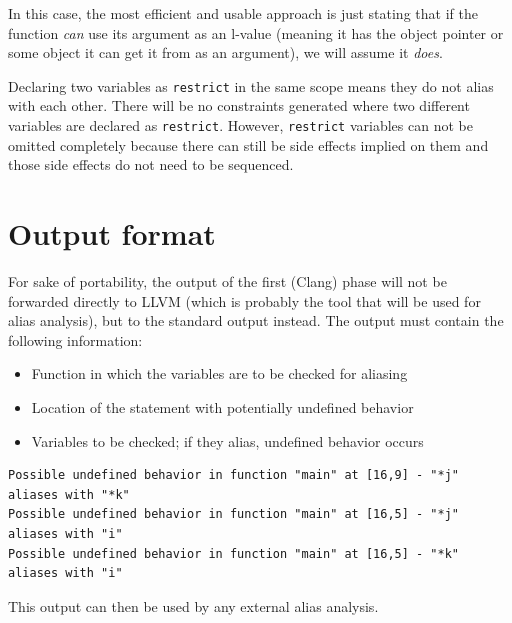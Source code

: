 In this case, the most efficient and usable approach is just stating that if the function \emph{can} use its argument as an l-value (meaning it has the object pointer or some object it can get it from as an argument), we will assume it \emph{does}.

Declaring two variables as \verb|restrict| in the same scope means they do not alias with each other.
There will be no constraints generated where two different variables are declared as \verb|restrict|.
However, \verb|restrict| variables can not be omitted completely because there can still be side effects
implied on them and those side effects do not need to be sequenced.

\section{Output format}
For sake of portability, the output of the first (Clang) phase will not be forwarded directly to LLVM (which is probably the tool that will be used for alias analysis), but to the standard output instead. The output must contain the following information:

\begin{itemize}
\item Function in which the variables are to be checked for aliasing
\item Location of the statement with potentially undefined behavior
\item Variables to be checked; if they alias, undefined behavior occurs
\end{itemize}

\begin{lstlisting}
Possible undefined behavior in function "main" at [16,9] - "*j" aliases with "*k"
Possible undefined behavior in function "main" at [16,5] - "*j" aliases with "i"
Possible undefined behavior in function "main" at [16,5] - "*k" aliases with "i"
\end{lstlisting}

This output can then be used by any external alias analysis.

